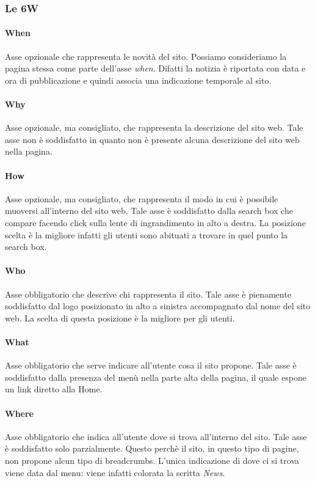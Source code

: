 \documentclass[../ProgettoTecWeb2.tex]{subfiles}
\begin{document}
		\subsubsection{Le 6W}
			\paragraph{When}
			Asse opzionale che rappresenta le novità del sito. Possiamo consideriamo la pagina stessa come parte dell'asse \textit{when}. Difatti la notizia è riportata con data e ora di pubblicazione e quindi associa una indicazione temporale al sito.

			\paragraph{Why}
			Asse opzionale, ma consigliato, che rappresenta la descrizione del sito web. Tale asse non è soddisfatto in quanto non è presente alcuna descrizione del sito web nella pagina.

			\paragraph{How}
			Asse opzionale, ma consigliato, che rappresenta il modo in cui è possibile muoversi all'interno del sito web. Tale asse è soddisfatto dalla search box che compare facendo click sulla lente di ingrandimento in alto a destra. La posizione scelta è la migliore infatti gli utenti sono abituati a trovare in quel punto la search box. 
			
			\paragraph{Who}
			Asse obbligatorio che descrive chi rappresenta il sito. Tale asse è pienamente soddisfatto dal logo posizionato in alto a sinistra accompagnato dal nome del sito web. La scelta di questa posizione è la migliore per gli utenti.

			\paragraph{What}
			Asse obbligatorio che serve indicare all'utente cosa il sito propone. Tale asse è soddisfatto dalla presenza del menù nella parte alta della pagina, il quale espone un link diretto alla Home.

			\paragraph{Where}
			Asse obbligatorio che indica all'utente dove si trova all'interno del sito. Tale asse è soddisfatto solo parzialmente. Questo perchè il sito, in questo tipo di pagine, non propone alcun tipo di breadcrumbs. L'unica indicazione di dove ci si trova viene data dal menu: viene infatti colorata la scritta \textit{News}.
\end{document}
